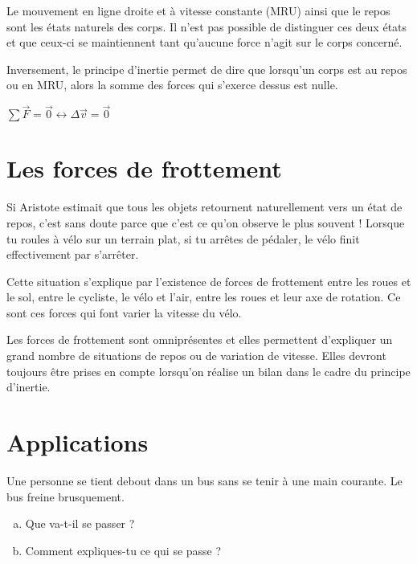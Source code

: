 Le mouvement en ligne droite et à vitesse constante (MRU) ainsi que le repos sont les états naturels des corps. Il n'est pas possible de distinguer ces deux états et que ceux-ci se maintiennent tant qu'aucune force n'agit sur le corps concerné.

Inversement, le principe d'inertie permet de dire que lorsqu'un corps est au repos ou en MRU, alors la somme des forces qui s'exerce dessus est nulle.

\begin{encadre}

    \(\sum{\vec{F}} = \vec{0} \leftrightarrow \Delta \vec{v}=\vec{0}\)
\end{encadre}

\newpage

\section{Les forces de frottement}
Si Aristote estimait que tous les objets retournent naturellement vers un état de repos, c'est sans doute parce que c'est ce qu'on observe le plus souvent ! Lorsque tu roules à vélo sur un terrain plat, si tu arrêtes de pédaler, le vélo finit effectivement par s'arrêter.

Cette situation s'explique par l'existence de forces de frottement entre les roues et le sol, entre le cycliste, le vélo et l'air, entre les roues et leur axe de rotation. Ce sont ces forces qui font varier la vitesse du vélo.

Les forces de frottement sont omniprésentes et elles permettent d'expliquer un grand nombre de situations de repos ou de variation de vitesse. Elles devront toujours être prises en compte lorsqu'on réalise un bilan dans le cadre du principe d'inertie.

\section{Applications}
\begin{exercise}
    Une personne se tient debout dans un bus sans se tenir à une main courante. Le bus freine brusquement.
    \begin{enumerate}[a)]
        \item Que va-t-il se passer ?
        \item Comment expliques-tu ce qui se passe ?
    \end{enumerate}
\end{exercise}

